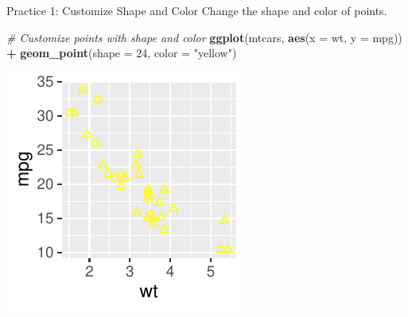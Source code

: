 \documentclass[
  ignorenonframetext,
]{beamer}
\newenvironment{Shaded}{\begin{snugshade}}{\end{snugshade}}
\newcommand{\AttributeTok}[1]{\textcolor[rgb]{0.13,0.29,0.53}{#1}}
\newcommand{\CommentTok}[1]{\textcolor[rgb]{0.56,0.35,0.01}{\textit{#1}}}
\newcommand{\DecValTok}[1]{\textcolor[rgb]{0.00,0.00,0.81}{#1}}
\newcommand{\FunctionTok}[1]{\textcolor[rgb]{0.13,0.29,0.53}{\textbf{#1}}}
\newcommand{\NormalTok}[1]{#1}
\newcommand{\SpecialCharTok}[1]{\textcolor[rgb]{0.81,0.36,0.00}{\textbf{#1}}}
\newcommand{\StringTok}[1]{\textcolor[rgb]{0.31,0.60,0.02}{#1}}
\begin{document}
\begin{frame}[fragile]{Practice 1: Customize Shape and Color}
\label{practice-1-customize-shape-and-color}
Change the shape and color of points.


\begin{Shaded}
\begin{Highlighting}[]
\CommentTok{\# Customize points with shape and color}
\FunctionTok{ggplot}\NormalTok{(mtcars, }\FunctionTok{aes}\NormalTok{(}\AttributeTok{x =}\NormalTok{ wt, }\AttributeTok{y =}\NormalTok{ mpg)) }\SpecialCharTok{+} \FunctionTok{geom\_point}\NormalTok{(}\AttributeTok{shape =} \DecValTok{24}\NormalTok{,}
    \AttributeTok{color =} \StringTok{"yellow"}\NormalTok{)}
\end{Highlighting}
\end{Shaded}

\begin{center}\includegraphics[width=0.5\linewidth]{Figs/unnamed-chunk-24-1} \end{center}
\end{frame}
\end{document}

